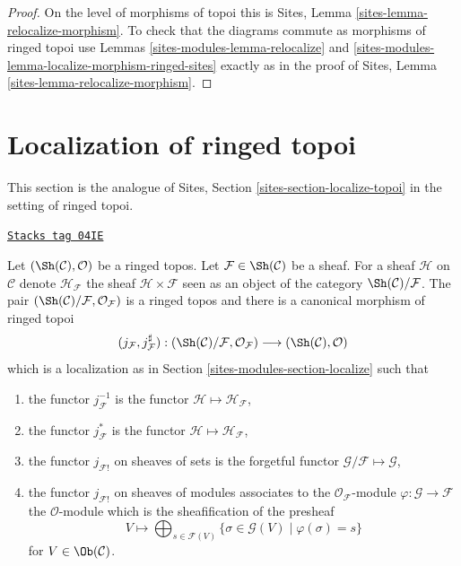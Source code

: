 \begin{proof}
On the level of morphisms of topoi this is
Sites, Lemma \ref{sites-lemma-relocalize-morphism}.
To check that the diagrams commute as morphisms of ringed topoi use
Lemmas \ref{sites-modules-lemma-relocalize} and
\ref{sites-modules-lemma-localize-morphism-ringed-sites}
exactly as in the proof of
Sites, Lemma \ref{sites-lemma-relocalize-morphism}.
\end{proof}

\section{Localization of ringed topoi}
\label{sites-modules-section-localize-ringed-topoi}
This section is the analogue of
Sites, Section \ref{sites-section-localize-topoi}
in the setting of ringed topoi.

\begin{lemma}
\label{sites-modules-lemma-localize-ringed-topos}
\href{https://stacks.math.columbia.edu/tag/04IE}{\texttt{Stacks tag 04IE}}

Let $(\Sh(\mathcal{C}), \mathcal{O})$ be a ringed topos.
Let $\mathcal{F} \in \Sh(\mathcal{C})$ be a sheaf.
For a sheaf $\mathcal{H}$ on $\mathcal{C}$ denote
$\mathcal{H}_\mathcal{F}$ the sheaf $\mathcal{H} \times \mathcal{F}$
seen as an object of the category $\Sh(\mathcal{C})/\mathcal{F}$.
The pair
$(\Sh(\mathcal{C})/\mathcal{F}, \mathcal{O}_\mathcal{F})$
is a ringed topos and there is a canonical morphism of ringed topoi
$$
(j_\mathcal{F}, j_\mathcal{F}^\sharp) :
(\Sh(\mathcal{C})/\mathcal{F}, \mathcal{O}_\mathcal{F})
\longrightarrow
(\Sh(\mathcal{C}), \mathcal{O})
$$
which is a localization as in
Section \ref{sites-modules-section-localize}
such that
\begin{enumerate}
\item the functor $j_\mathcal{F}^{-1}$ is the functor
$\mathcal{H} \mapsto \mathcal{H}_\mathcal{F}$,
\item the functor $j_\mathcal{F}^*$ is the functor
$\mathcal{H} \mapsto \mathcal{H}_\mathcal{F}$,
\item the functor $j_{\mathcal{F}!}$ on sheaves of sets is the forgetful
functor $\mathcal{G}/\mathcal{F} \mapsto \mathcal{G}$,
\item the functor $j_{\mathcal{F}!}$ on sheaves of modules associates
to the $\mathcal{O}_\mathcal{F}$-module
$\varphi : \mathcal{G} \to \mathcal{F}$ the $\mathcal{O}$-module
which is the sheafification of the presheaf
$$
V \longmapsto
\bigoplus\nolimits_{s \in \mathcal{F}(V)}
\{\sigma \in \mathcal{G}(V) \mid \varphi(\sigma) = s \}
$$
for $V \in \Ob(\mathcal{C})$.
\end{enumerate}
\end{lemma}

